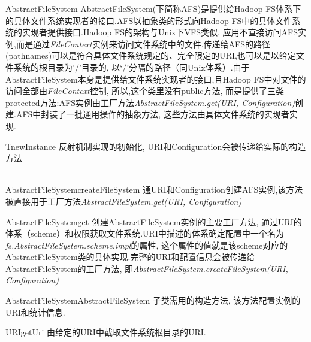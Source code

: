 \begin{XeClass}{AbstractFileSystem}
AbstractFileSystem(下简称AFS)是提供给Hadoop FS体系下的具体文件系统实现者的接口.AFS以抽象类的形式向Hadoop FS中的具体文件系统的实现者提供接口.Hadoop FS的架构与Unix下VFS类似, 应用不直接访问AFS实例,而是通过\emph{FileContext}实例来访问文件系统中的文件.传递给AFS的路径(pathnames)可以是符合具体文件系统规定的、完全限定的URI,也可以是以给定文件系统的根目录为'/'目录的, 以‘/’分隔的路径（同Unix体系）.由于AbstractFileSystem本身是提供给文件系统实现者的接口,且Hadoop FS中对文件的访问全部由\emph{FileContext}控制, 所以,这个类里没有public方法, 而是提供了三类protected方法:AFS实例由工厂方法\emph{AbstractFileSystem.get(URI, Configuration)}创建.AFS中封装了一批通用操作的抽象方法, 这些方法由具体文件系统的实现者实现.

    \begin{XeMethod}{\XeStatic}{T}{newInstance}
        反射机制实现的初始化, URI和Configuration会被传递给实际的构造方法
    \end{XeMethod}

    \begin{XeMethod}{\XeStatic \\ \XePrivate}{AbstractFileSystem}{createFileSystem}
        通URI和Configuration创建AFS实例,该方法被直接用于工厂方法\emph{AbstractFileSystem.get(URI, Configuration)}
    \end{XeMethod}

    \begin{XeMethod}{\XeStatic}{AbstractFileSystem}{get}
        创建AbstractFileSystem实例的主要工厂方法, 通过URI的体系（scheme）和权限获取文件系统.URI中描述的体系确定配置中一个名为\emph{fs.AbstractFileSystem.scheme.impl}的属性, 这个属性的值就是该scheme对应的AbstractFileSystem类的具体实现.完整的URI和配置信息会被传递给AbstractFileSystem的工厂方法, 即\emph{AbstractFileSystem.createFileSystem(URI, Configuration)}
    \end{XeMethod}

    \begin{XeMethod}{\XeProtected}{AbstractFileSystem}{AbstractFileSystem}
        子类需用的构造方法, 该方法配置实例的URI和统计信息.
    \end{XeMethod}

    \begin{XeMethod}{\XePrivate}{URI}{getUri}
        由给定的URI中截取文件系统根目录的URI.
    \end{XeMethod}

\end{XeClass}
